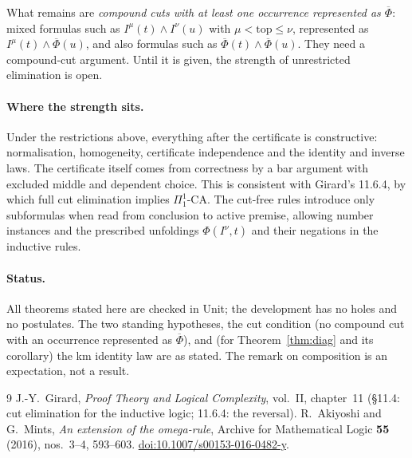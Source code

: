 \documentclass[11pt]{article}
\theoremstyle{remark}
\newcommand{\Phib}{\overline{\Phi}}
\begin{document}
What remains are \emph{compound cuts with at least one occurrence
represented as $\Phib$}: mixed formulas such as $I^\mu(t)\wedge I^\nu(u)$
with $\mu<\mathrm{top}\le\nu$, represented as $I^\mu(t)\wedge\Phib(u)$, and
also formulas such as $\Phib(t)\wedge\Phib(u)$. They need a compound-cut
argument. Until it is given, the strength of unrestricted elimination is
open.

\paragraph{Where the strength sits.} Under the restrictions above,
everything after the certificate is constructive: normalisation,
homogeneity, certificate independence and the identity and inverse
laws. The certificate itself comes from correctness by a bar argument with
excluded middle and dependent choice. This is consistent with Girard's
11.6.4, by which full cut elimination implies $\Pi^1_1$-$\mathrm{CA}$. The
cut-free rules introduce only subformulas when read from conclusion to
active premise, allowing number instances and the prescribed unfoldings
$\Phi(I^\nu,t)$ and their negations in the inductive rules.

\paragraph{Status.} All theorems stated here are checked in Unit; the
development has no holes and no postulates. The two standing hypotheses,
the cut condition (no compound cut with an occurrence represented as
$\Phib$), and (for
Theorem~\ref{thm:diag} and its corollary) the km identity law are as
stated. The remark on composition is an expectation, not a result.

\begin{thebibliography}{9}
 J.-Y.~Girard, \emph{Proof Theory and Logical Complexity},
vol.~II, chapter~11 (\S11.4: cut elimination for the inductive logic;
11.6.4: the reversal).
 R.~Akiyoshi and G.~Mints, \emph{An extension of the
omega-rule}, Archive for Mathematical Logic \textbf{55} (2016),
nos.~3--4, 593--603. \href{https://doi.org/10.1007/s00153-016-0482-y}{doi:10.1007/s00153-016-0482-y}.
\end{thebibliography}
\end{document}
